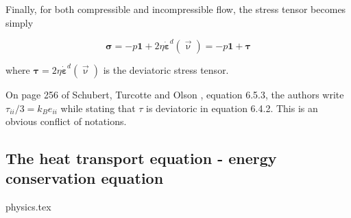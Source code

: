 Finally, for both compressible and incompressible flow, the stress tensor becomes simply
\begin{mdframed}[backgroundcolor=blue!5]
\begin{equation}
{\bm \sigma}=-p {\bm 1} + 2\eta \dot{\bm \varepsilon}^d(\vec\upnu) = -p {\bm 1} + {\bm \tau}
\end{equation}
\end{mdframed}
where ${\bm \tau} = 2\eta \dot{\bm \varepsilon}^d(\vec\upnu)$ is the deviatoric stress tensor.

\begin{remark}
On page 256 of Schubert, Turcotte and Olson \cite{scto01}, 
equation 6.5.3, the authors write $\tau_{ii}/3=k_B e_{ii}$ while stating that $\tau$ is deviatoric in equation 6.4.2. 
This is an obvious conflict of notations. 
\end{remark}

\subsection{The heat transport equation - energy conservation equation \label{ss:hte}}
\begin{flushright} {\tiny {\color{gray} physics.tex}} \end{flushright}

